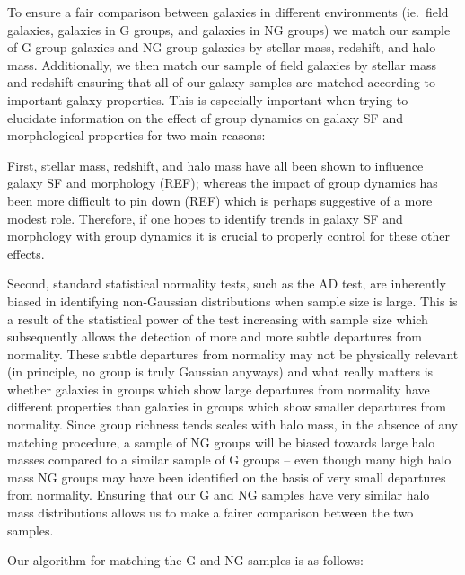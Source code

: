 \documentclass[a4paper,fleqn,usenatbib]{mnras}
\begin{document}
To ensure a fair comparison between galaxies in different environments
(ie.\ field galaxies, galaxies in G groups, and galaxies in NG groups)
we match our sample of G group galaxies and NG group galaxies by
stellar mass, redshift, and halo mass.  Additionally, we then match
our sample of field galaxies by stellar mass and redshift ensuring
that all of our galaxy samples are matched according to important galaxy
properties.  This is especially important when trying to elucidate
information on the effect of group dynamics on galaxy SF and
morphological properties for
two main reasons:
\par
First, stellar mass, redshift, and halo mass have
all been shown to influence galaxy SF and morphology (REF); whereas
the impact of group dynamics has been more difficult to pin down
(REF) which is perhaps suggestive of a more modest role.  Therefore,
if one hopes to identify trends in galaxy SF and morphology with group
dynamics it is crucial to properly control for these other effects.
\par
Second, standard statistical normality tests, such as the AD test, are
inherently biased in identifying non-Gaussian distributions when
sample size is large.  This is a result of the statistical power of
the test increasing with sample size which subsequently allows the
detection of more and more subtle departures from normality.  These subtle
departures from normality may not be physically relevant (in
principle, no group is truly Gaussian anyways) and what really matters is
whether galaxies in groups which show large departures from normality
have different properties than galaxies in groups which show smaller
departures from normality. Since group
richness tends scales with halo mass, in the absence of any matching
procedure, a sample of NG groups will be biased towards large halo
masses compared to a similar sample of G groups -- even though many
high halo mass NG groups may have been identified on the basis of very
small departures from normality.  Ensuring that our G and NG
samples have very similar halo mass distributions allows us to make a
fairer comparison between the two samples.
\par
Our algorithm for matching the G and NG samples is as follows:
\end{document}
